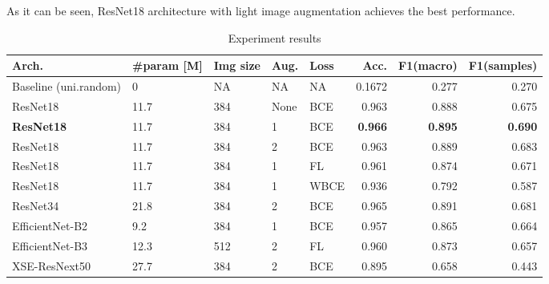 \documentclass[conference]{IEEEtran}
\begin{document}
As it can be seen, ResNet18 architecture with light image augmentation achieves the best performance. 

\begin{table}[bp]
\caption{Experiment results}
\begin{center}
\begin{tabular}{lllll|rrr}
\textbf{Arch.} & \textbf{\#param [M]} & \multicolumn{1}{l}{\textbf{Img size}} & \textbf{Aug.} & \textbf{Loss} & \multicolumn{1}{r}{\textbf{Acc.}} & \multicolumn{1}{r}{\textbf{F1(macro)}} & \multicolumn{1}{r}{\textbf{F1(samples)}} \\ \hline
Baseline (uni.random) & 0        & NA & NA                    & NA     & 0.1672                                & 0.277                                  & 0.270                                   \\ 
ResNet18              & 11.7     & 384 & None                 & BCE    & 0.963                                 & 0.888                                  & 0.675                                   \\ 
\textbf{ResNet18}     & 11.7     & 384 & 1                    & BCE    & \textbf{0.966}                        & \textbf{0.895}                         & \textbf{0.690}                                   \\ 
ResNet18              & 11.7     & 384 & 2                    & BCE    & 0.963                                 & 0.889                                  & 0.683                                   \\ 
ResNet18              & 11.7     & 384 & 1                    & FL     & 0.961                                 & 0.874                                  & 0.671                                   \\ 
ResNet18              & 11.7     & 384 & 1                    & WBCE   & 0.936                                 & 0.792                                  & 0.587                                   \\ 
ResNet34              & 21.8     & 384 & 2                    & BCE    & 0.965                                 & 0.891                                  & 0.681                                   \\ 
EfficientNet-B2       & 9.2      & 384 & 1                    & BCE    & 0.957                                 & 0.865                                  & 0.664                                   \\ 
EfficientNet-B3       & 12.3     & 512 & 2                    & FL     & 0.960                                 & 0.873                                  & 0.657                                   \\ 
XSE-ResNext50         & 27.7     & 384 & 2                    & BCE    & 0.895                                 & 0.658                                  & 0.443                                   \\
\end{tabular}
\label{table:experiment_results}
\end{center}
\end{table}
\end{document}
